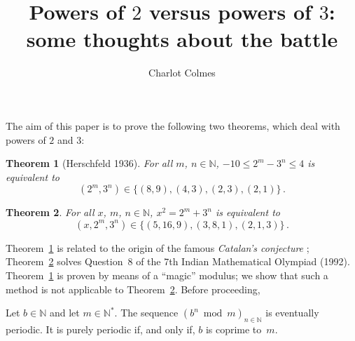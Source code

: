 \documentclass[12pt]{article}
\newcommand{\bZ}{\mathbb{Z}}
\newcommand{\bN}{\mathbb{N}} %
\newcommand{\bNast}{\bN^*}
\newtheorem{theorem}{Theorem}
\theoremstyle{definition}
\begin{document}
 \title{Powers of $2$ versus powers of $3$: some thoughts about the battle}
 \author{Charlot Colmes}
 \maketitle 


 The aim of this paper is to prove the following two theorems, which deal with powers of $2$ and $3$:

   \begin{theorem}[Herschfeld 1936] \label{thm:2m-moins-3n}
     For all $m$, $n \in \bN$,
     $- 10 \le 2^m - 3^n  \le 4$ is equivalent to
     $$(2^m, 3^n) \in \{ (8, 9), (4, 3), (2, 3), (2, 1)  \} \, .
     $$
   \end{theorem}

   
   \begin{theorem} \label{thm:IndMO}
     For all $x$, $m$, $n \in \bN$,
     $x^2 = 2^m + 3^n$ is equivalent to
     $$
     (x, 2^m, 3^n) \in \{  (5, 16, 9), (3, 8, 1), (2, 1, 3) \} \, .
     $$
   \end{theorem}

   Theorem~\ref{thm:2m-moins-3n} is related to the origin
   of the famous \emph{Catalan's conjecture} \cite{Ribenboim-Catalan,Herschfeld36};
   Theorem~\ref{thm:IndMO} solves Question~$8$ of the $7$th Indian Mathematical Olympiad (1992).
   Theorem~\ref{thm:2m-moins-3n} is proven by means of a ``magic'' modulus;
   we show that such a method is not applicable to Theorem~\ref{thm:IndMO}.
   Before proceeding,

   Let $b \in \bN$ and let $m \in \bNast$.
   The sequence $\left( b^n \bmod m \right)_{n \in \bN}$ is eventually periodic.
   It is purely periodic if, and only if, $b$ is coprime to~$m$.
   
\end{document}
